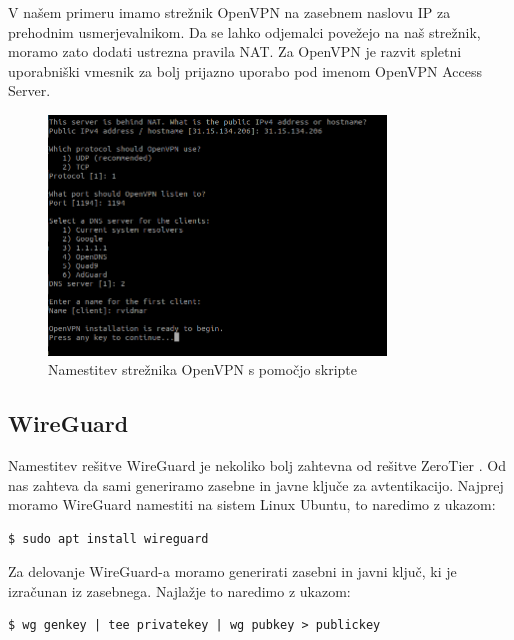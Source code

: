 \documentclass[a4paper, 12pt]{book}
\begin{document}
V našem primeru imamo strežnik OpenVPN na zasebnem naslovu IP za prehodnim usmerjevalnikom. Da se lahko odjemalci povežejo na naš strežnik, moramo zato dodati ustrezna pravila NAT. Za OpenVPN je razvit spletni uporabniški vmesnik za bolj prijazno uporabo pod imenom OpenVPN Access Server.

\begin{figure}[H]
\begin{center}
\includegraphics[width=0.8\textwidth]{fotografije/nalaganjeOvpn.png}
\end{center}
\caption{Namestitev strežnika OpenVPN s pomočjo skripte \cite{rvidmar}}
\label{Namestitev_OpenVPN}
\end{figure}

\subsection{WireGuard} %
Namestitev rešitve WireGuard je nekoliko bolj zahtevna od rešitve ZeroTier \cite{donenfeld_quick_nodate}. Od nas zahteva da sami generiramo zasebne in javne ključe za avtentikacijo. Najprej moramo WireGuard namestiti na sistem Linux Ubuntu, to naredimo z ukazom:

\begin{verbatim}
$ sudo apt install wireguard
\end{verbatim}

Za delovanje WireGuard-a moramo generirati zasebni in javni ključ, ki je izračunan iz zasebnega. Najlažje to naredimo z ukazom:

\begin{verbatim}
$ wg genkey | tee privatekey | wg pubkey > publickey
\end{verbatim}
\end{document}
